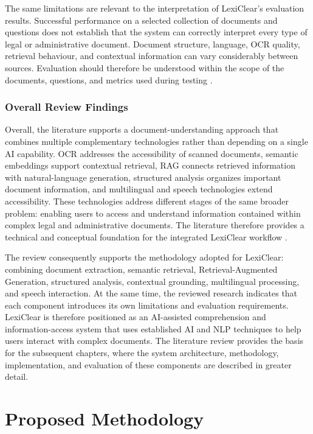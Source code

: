 \documentclass[12pt,a4paper,oneside]{report}
\begin{document}
The same limitations are relevant to the interpretation of LexiClear's
evaluation results. Successful performance on a selected collection of
documents and questions does not establish that the system can correctly
interpret every type of legal or administrative document. Document structure,
language, OCR quality, retrieval behaviour, and contextual information can
vary considerably between sources. Evaluation should therefore be understood
within the scope of the documents, questions, and metrics used during testing \cite{chalkidis2022lexglue,es2024ragas}.

\subsection{Overall Review Findings}

Overall, the literature supports a document-understanding approach that
combines multiple complementary technologies rather than depending on a
single AI capability. OCR addresses the accessibility of scanned documents,
semantic embeddings support contextual retrieval, RAG connects retrieved
information with natural-language generation, structured analysis organizes
important document information, and multilingual and speech technologies
extend accessibility. These technologies address different stages of the
same broader problem: enabling users to access and understand information
contained within complex legal and administrative documents. The literature
therefore provides a technical and conceptual foundation for the integrated
LexiClear workflow
\cite{pramanik2025,lewis2020rag,ash2024translating}.

The review consequently supports the methodology adopted for LexiClear:
combining document extraction, semantic retrieval, Retrieval-Augmented
Generation, structured analysis, contextual grounding, multilingual
processing, and speech interaction. At the same time, the reviewed research
indicates that each component introduces its own limitations and evaluation
requirements. LexiClear is therefore positioned as an AI-assisted
comprehension and information-access system that uses established AI and NLP
techniques to help users interact with complex documents. The literature
review provides the basis for the subsequent chapters, where the system
architecture, methodology, implementation, and evaluation of these
components are described in greater detail.

\chapter{Proposed Methodology}
\end{document}
